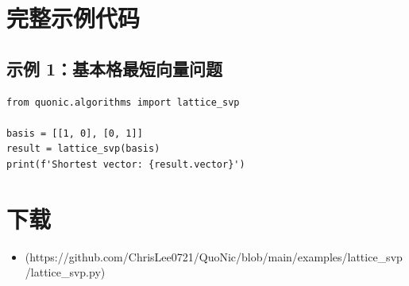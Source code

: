 \documentclass[12pt,a4paper]{article}
\begin{document}
\section{完整示例代码}

\subsection{示例 1：基本格最短向量问题}

\begin{verbatim}
from quonic.algorithms import lattice_svp

basis = [[1, 0], [0, 1]]
result = lattice_svp(basis)
print(f'Shortest vector: {result.vector}')
\end{verbatim}

\section{下载}

\begin{itemize}
  \item [lattice\_svp.py](https://github.com/ChrisLee0721/QuoNic/blob/main/examples/lattice_svp/lattice_svp.py)
\end{itemize}
\end{document}
